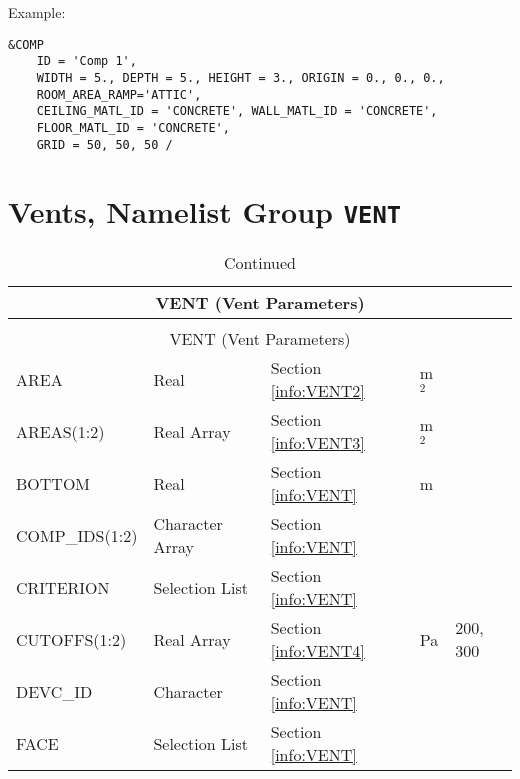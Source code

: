 \noindent Example:
\begin{lstlisting}
&COMP
	ID = 'Comp 1',
	WIDTH = 5., DEPTH = 5., HEIGHT = 3., ORIGIN = 0., 0., 0.,
	ROOM_AREA_RAMP='ATTIC',
	CEILING_MATL_ID = 'CONCRETE', WALL_MATL_ID = 'CONCRETE',
	FLOOR_MATL_ID = 'CONCRETE',
	GRID = 50, 50, 50 /
\end{lstlisting}




\clearpage
\section{Vents, Namelist Group \texorpdfstring{{\tt VENT}}{VENT}}
\begin{longtable}{@{\extracolsep{\fill}}|l|l|l|l|l|}
\caption[Vent Parameters ({\ct VENT} namelist group)]{For more information see Section~\ref{info:VENT}.}
\label{tbl:VENT} \\
\hline
\multicolumn{5}{|c|}{{\ct VENT} (Vent Parameters)} \\
\hline \hline
\endfirsthead
\caption[]{Continued} \\
\hline
\multicolumn{5}{|c|}{{\ct VENT} (Vent Parameters)} \\
\hline \hline
\endhead
{\ct AREA}      	  & Real  	& Section \ref{info:VENT2}                 & m$^2$                       &                 \\ \hline
{\ct AREAS(1:2)}      	  & Real Array 	& Section \ref{info:VENT3}                 & m$^2$                       &                 \\ \hline
{\ct BOTTOM}       	  & Real  	& Section \ref{info:VENT}                 & m                           &                 \\ \hline
{\ct COMP\_IDS(1:2)}     	  & Character Array   & Section \ref{info:VENT}                 &                             &                 \\ \hline
{\ct CRITERION}           & Selection List   & Section \ref{info:VENT}                 &                             &                 \\ \hline
{\ct CUTOFFS(1:2)}         & Real Array 	& Section \ref{info:VENT4}                 & Pa                          &     200, 300     \\ \hline
{\ct DEVC\_ID}            & Character   & Section \ref{info:VENT}                 &                             &                 \\ \hline
{\ct FACE}      	  & Selection List   & Section \ref{info:VENT}                 &                             &                 \\ \hline

\end{longtable}
